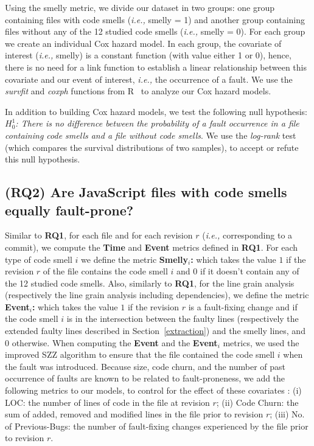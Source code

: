 \documentclass[smallcondensed]{svjour3}
\newcommand{\ie}{{\textit{i.e.,}}}
\begin{document}
{Using the smelly metric, we divide our dataset in two groups: one group containing files with code smells (\ie{} smelly = 1) and another group containing files without any of the 12 studied code smells (\ie{} smelly = 0). For each group we create an individual Cox hazard model. In each group, the covariate of interest (\ie{} smelly) is a constant function (with value either 1 or 0), hence, there is no need for a link function to establish a linear relationship between this covariate and our event of interest, \ie{} the occurrence of a fault. We use the \textsl{survfit} and \textsl{coxph} functions from R~\cite{rPackage} to analyze our Cox hazard models.

In addition to building Cox hazard models, we test the following null hypothesis: \emph{$H^{1}_{0}$: There is no difference between the probability of a fault occurrence in a file containing code smells and a file without code smells}. We use the \textsl{log-rank} test (which compares the survival distributions of two samples), to accept or refute this null hypothesis.

\subsection*{(RQ2) Are JavaScript files with code smells equally fault-prone?}\label{AnalysisRQ2}

Similar to \textbf{RQ1}, for each file and for each revision $r$ (\ie{} corresponding to a commit), we compute the \textbf{Time} and \textbf{Event} metrics defined in \textbf{RQ1}. For each type of code smell $i$ we define the metric \textbf{Smelly$_{i}$:} which takes the value $1$ if the revision $r$ of the file contains the code smell $i$ and $0$ if it doesn't contain any of the 12 studied code smells. Also, similarly to \textbf{RQ1}, for the line grain analysis (respectively the line grain analysis including dependencies), we define the metric \textbf{Event$_{i}$:} which takes the value $1$ if the revision $r$ is a fault-fixing change and if the code smell $i$ is in the intersection between  the faulty lines (respectively the extended faulty lines described in Section~\ref{extraction}) and the smelly lines, and $0$ otherwise. When computing the \textbf{Event} and the \textbf{Event$_{i}$} metrics, we used the improved SZZ algorithm to ensure that the file contained the code smell $i$ when the fault was introduced. %
Because size, code churn, and the number of past occurrence of faults are known to be related to fault-proneness, we add the following metrics to our models, to control for the effect of these covariates : (i) LOC: the number of lines of code in the file at revision $r$; (ii) Code Churn: the sum of added, removed and modified lines in the file prior to revision $r$; (iii) No. of Previous-Bugs: the number of fault-fixing changes experienced by the file prior to revision $r$.

}
\end{document}
